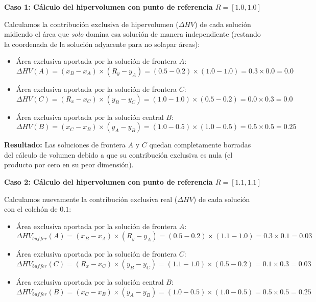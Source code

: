 \documentclass[a4paper,10pt]{article}
\begin{document}
\textbf{Caso 1: Cálculo del hipervolumen con punto de referencia $R = [1.0, 1.0]$}

Calculamos la contribución exclusiva de hipervolumen ($\Delta HV$) de cada solución midiendo el área que \textit{solo} domina esa solución de manera independiente (restando la coordenada de la solución adyacente para no solapar áreas):
\begin{itemize}
    \item Área exclusiva aportada por la solución de frontera $A$:
    \begin{equation}
        \Delta HV(A) = (x_B - x_A) \times (R_y - y_A) = (0.5 - 0.2) \times (1.0 - 1.0) = 0.3 \times 0.0 = 0.0
    \end{equation}
    
    \item Área exclusiva aportada por la solución de frontera $C$:
    \begin{equation}
        \Delta HV(C) = (R_x - x_C) \times (y_B - y_C) = (1.0 - 1.0) \times (0.5 - 0.2) = 0.0 \times 0.3 = 0.0
    \end{equation}
    
    \item Área exclusiva aportada por la solución central $B$:
    \begin{equation}
        \Delta HV(B) = (x_C - x_B) \times (y_A - y_B) = (1.0 - 0.5) \times (1.0 - 0.5) = 0.5 \times 0.5 = 0.25
    \end{equation}
\end{itemize}

\textbf{Resultado:} Las soluciones de frontera $A$ y $C$ quedan completamente borradas del cálculo de volumen debido a que su contribución exclusiva es nula (el producto por cero en su peor dimensión).

\textbf{Caso 2: Cálculo del hipervolumen con punto de referencia $R = [1.1, 1.1]$}

Calculamos nuevamente la contribución exclusiva real ($\Delta HV$) de cada solución con el colchón de $0.1$:
\begin{itemize}
    \item Área exclusiva aportada por la solución de frontera $A$:
    \begin{equation}
        \Delta HV_{buffer}(A) = (x_B - x_A) \times (R_y - y_A) = (0.5 - 0.2) \times (1.1 - 1.0) = 0.3 \times 0.1 = 0.03
    \end{equation}
    
    \item Área exclusiva aportada por la solución de frontera $C$:
    \begin{equation}
        \Delta HV_{buffer}(C) = (R_x - x_C) \times (y_B - y_C) = (1.1 - 1.0) \times (0.5 - 0.2) = 0.1 \times 0.3 = 0.03
    \end{equation}
    
    \item Área exclusiva aportada por la solución central $B$:
    \begin{equation}
        \Delta HV_{buffer}(B) = (x_C - x_B) \times (y_A - y_B) = (1.0 - 0.5) \times (1.0 - 0.5) = 0.5 \times 0.5 = 0.25
    \end{equation}
\end{itemize}
\end{document}
